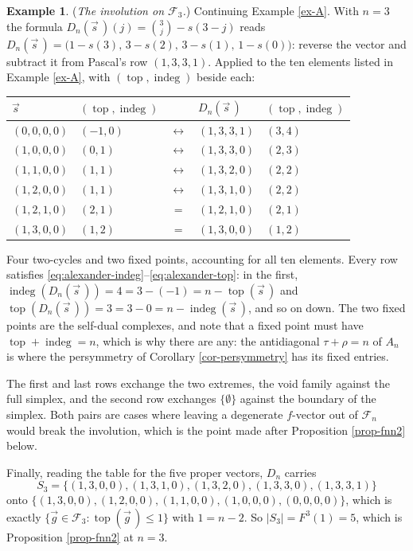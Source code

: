 \documentclass[11pt, a4paper, abstract=yes]{scrartcl}
\theoremstyle{definition}
\newtheorem{mexample}[definition]{Example}
\theoremstyle{remark}
\theoremstyle{plain}
\newcommand{\indeg}{\operatorname{indeg}}
\newcommand{\tp}{\operatorname{top}}
\begin{document}
\begin{mexample}
(\emph{The involution on \(\mathcal F_3\).}) Continuing Example \ref{ex-A}. With \(n=3\) the formula
\(D_n(\vec s\,)(j)=\binom 3j-s(3-j)\) reads \(D_n(\vec s\,)=\bigl(1-s(3),\,3-s(2),\,3-s(1),\,1-s(0)\bigr)\):
reverse the vector and subtract it from Pascal's row \((1,3,3,1)\). Applied to the ten elements listed
in Example \ref{ex-A}, with \((\tp,\indeg)\) beside each:
\begingroup\small
\begin{center}
\begin{tabular}{@{}llcll@{}}
  \toprule
  \(\vec s\) & \((\tp,\indeg)\) & & \(D_n(\vec s\,)\) & \((\tp,\indeg)\)\\
  \midrule
  \((0,0,0,0)\) & \((-1,0)\) & \(\longleftrightarrow\) & \((1,3,3,1)\) & \((3,4)\)\\
  \((1,0,0,0)\) & \((0,1)\)  & \(\longleftrightarrow\) & \((1,3,3,0)\) & \((2,3)\)\\
  \((1,1,0,0)\) & \((1,1)\)  & \(\longleftrightarrow\) & \((1,3,2,0)\) & \((2,2)\)\\
  \((1,2,0,0)\) & \((1,1)\)  & \(\longleftrightarrow\) & \((1,3,1,0)\) & \((2,2)\)\\
  \addlinespace
  \((1,2,1,0)\) & \((2,1)\)  & \(=\)                   & \((1,2,1,0)\) & \((2,1)\)\\
  \((1,3,0,0)\) & \((1,2)\)  & \(=\)                   & \((1,3,0,0)\) & \((1,2)\)\\
  \bottomrule
\end{tabular}
\end{center}
\endgroup
Four two-cycles and two fixed points, accounting for all ten elements. Every row satisfies
\eqref{eq:alexander-indeg}--\eqref{eq:alexander-top}: in the first, \(\indeg(D_n(\vec s\,))=4=3-(-1)=n-\tp(\vec s\,)\) and
\(\tp(D_n(\vec s\,))=3=3-0=n-\indeg(\vec s\,)\), and so on down. The two fixed points are the
self-dual complexes, and note that a fixed point must have \(\tp+\indeg=n\), which is why there are
any: the antidiagonal \(\tau+\rho=n\) of \(A_n\) is where the persymmetry of
Corollary \ref{cor-persymmetry} has its fixed entries.

The first and last rows exchange the two extremes, the void family against the full simplex, and the
second row exchanges \(\lbrace\emptyset\rbrace\) against the boundary of the simplex. Both pairs are
cases where leaving a degenerate \(f\)-vector out of \(\mathcal F_n\) would break the involution, which is
the point made after Proposition \ref{prop-fnn2} below.

Finally, reading the table for the five proper vectors, \(D_n\) carries
\[
  S_3=\bigl\lbrace(1,3,0,0),(1,3,1,0),(1,3,2,0),(1,3,3,0),(1,3,3,1)\bigr\rbrace
\]
onto \(\lbrace(1,3,0,0),(1,2,0,0),(1,1,0,0),(1,0,0,0),(0,0,0,0)\rbrace\), which is exactly
\(\lbrace\vec g\in\mathcal F_3:\tp(\vec g\,)\le1\rbrace\) with \(1=n-2\). So \(|S_3|=F^3(1)=5\), which
is Proposition \ref{prop-fnn2} at \(n=3\).
\label{ex-alexander-f3}
\end{mexample}
\end{document}
